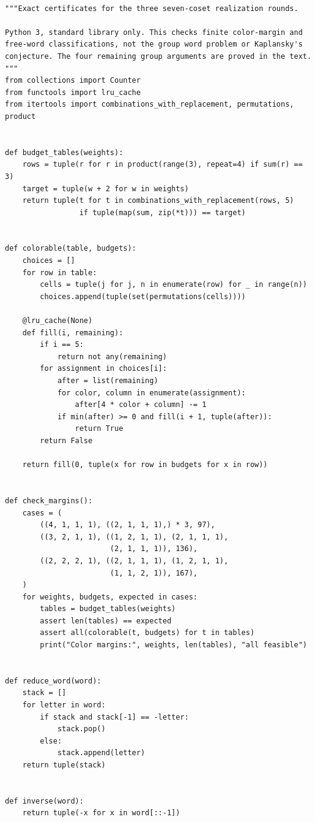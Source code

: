 \documentclass[11pt,a4paper,oneside]{report}
\theoremstyle{definition}
\theoremstyle{remark}
\begin{document}
\begin{lstlisting}

"""Exact certificates for the three seven-coset realization rounds.

Python 3, standard library only. This checks finite color-margin and
free-word classifications, not the group word problem or Kaplansky's
conjecture. The four remaining group arguments are proved in the text.
"""
from collections import Counter
from functools import lru_cache
from itertools import combinations_with_replacement, permutations, product


def budget_tables(weights):
    rows = tuple(r for r in product(range(3), repeat=4) if sum(r) == 3)
    target = tuple(w + 2 for w in weights)
    return tuple(t for t in combinations_with_replacement(rows, 5)
                 if tuple(map(sum, zip(*t))) == target)


def colorable(table, budgets):
    choices = []
    for row in table:
        cells = tuple(j for j, n in enumerate(row) for _ in range(n))
        choices.append(tuple(set(permutations(cells))))

    @lru_cache(None)
    def fill(i, remaining):
        if i == 5:
            return not any(remaining)
        for assignment in choices[i]:
            after = list(remaining)
            for color, column in enumerate(assignment):
                after[4 * color + column] -= 1
            if min(after) >= 0 and fill(i + 1, tuple(after)):
                return True
        return False

    return fill(0, tuple(x for row in budgets for x in row))


def check_margins():
    cases = (
        ((4, 1, 1, 1), ((2, 1, 1, 1),) * 3, 97),
        ((3, 2, 1, 1), ((1, 2, 1, 1), (2, 1, 1, 1),
                        (2, 1, 1, 1)), 136),
        ((2, 2, 2, 1), ((2, 1, 1, 1), (1, 2, 1, 1),
                        (1, 1, 2, 1)), 167),
    )
    for weights, budgets, expected in cases:
        tables = budget_tables(weights)
        assert len(tables) == expected
        assert all(colorable(t, budgets) for t in tables)
        print("Color margins:", weights, len(tables), "all feasible")


def reduce_word(word):
    stack = []
    for letter in word:
        if stack and stack[-1] == -letter:
            stack.pop()
        else:
            stack.append(letter)
    return tuple(stack)


def inverse(word):
    return tuple(-x for x in word[::-1])



\end{lstlisting}
\end{document}
